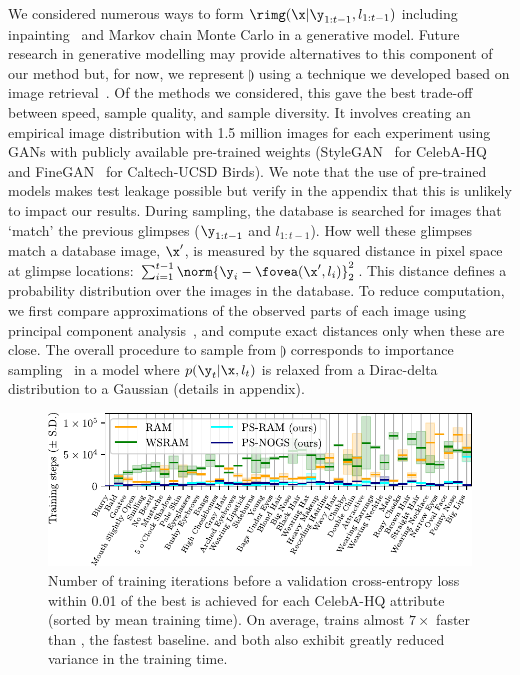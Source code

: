 \label{sec:nogs-image-sampling}
We considered numerous ways to form $\rimg(\x | \y_{1:t-1}, l_{1:t-1})$
including inpainting~\cite{pathak2016context,isola2017image} and Markov chain
Monte Carlo in a generative model. Future research in generative modelling may
provide alternatives to this component of our method but, for now, we
represent $\rimg$ using a technique we developed based on image
retrieval~\cite{jegou2010improving}. Of the methods we considered, this gave the
best trade-off between speed, sample quality, and sample diversity. It involves creating an
empirical image distribution with 1.5 million images for each experiment using
GANs with publicly available pre-trained weights
(StyleGAN~\cite{karras2018style} for CelebA-HQ and
FineGAN~\cite{singh2019finegan} for Caltech-UCSD Birds). We note that the use of
pre-trained models makes test leakage possible but verify in the appendix that
this is unlikely to impact our results. During sampling, the database is
searched for images that `match' the previous glimpses ($\y_{1:t-1}$ and
$l_{1:t-1}$). How well these glimpses match a database image, $\x'$, is measured
by the squared distance in pixel space at glimpse locations:
$\sum_{i=1}^{t-1} \norm{\y_i - \fovea(\x', l_i)}^2_2$. This distance defines a
probability distribution over the images in the database.
%
To reduce computation, we first compare approximations of the observed parts of
each image using principal component analysis~\cite{jolliffe2011principal}, and
compute exact distances only when these are close. The overall procedure to
sample from $\rimg$ corresponds to importance
sampling~\cite{arulampalam2002tutorial} in a model where $p(\y_t | \x, l_t)$ is
relaxed from a Dirac-delta distribution to a Gaussian (details in appendix).

\begin{figure}
  \centering
  \includegraphics[scale=1]{figs/nogs/celebhq-training-time}
  \vspace{-.2cm}
  \caption{Number of training iterations before a validation cross-entropy loss
    within 0.01 of the best is achieved for each CelebA-HQ attribute (sorted by
    mean training time). On average, \PSNOGS{} trains almost $7\times$ faster
    than \RAM{}, the fastest baseline. \PSNOGS{} and \PSRAM{} both also exhibit
    greatly reduced variance in the training time.}
  \label{fig:celebhq-time}
  \vspace{-.3cm}
\end{figure}

